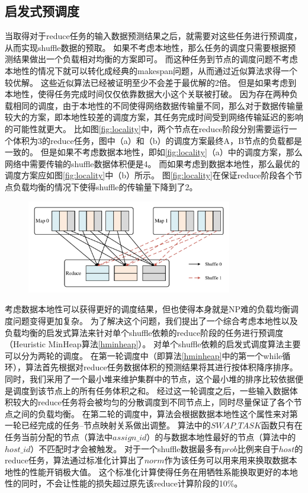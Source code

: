 \subsection{启发式预调度}
\label{subsec:schedule}

当取得对于reduce任务的输入数据预测结果之后，就需要对这些任务进行预调度，从而实现shuffle数据的预取。
如果不考虑本地性，那么任务的调度只需要根据预测结果做出一个负载相对均衡的方案即可。
而这种任务到节点的调度问题不考虑本地性的情况下就可以转化成经典的makespan问题，从而通过近似算法求得一个较优解\cite{approximation}。
这些近似算法已经被证明至少不会差于最优解的2倍。
但是如果考虑到本地性，使得任务完成时间仅仅依靠数据大小这个关联被打破。
因为存在两种负载相同的调度，由于本地性的不同使得网络数据传输量不同，那么对于数据传输量较大的方案，即本地性较差的调度方案，其任务完成时间受到网络传输延迟的影响的可能性就更大。
比如图\ref{fig:locality}中，两个节点在reduce阶段分别需要运行一个体积为3的reduce任务，图中（a）和（b）的调度方案最终A，B节点的负载都是一致的。
但是如果不考虑数据本地性，即如\ref{fig:locality}（a）中的调度方案，那么网络中需要传输的shuffle数据体积便是4。
而如果考虑到数据本地性，那么最优的调度方案应如图\ref{fig:locality}中（b）所示。
图\ref{fig:locality}在保证reduce阶段各个节点负载均衡的情况下使得shuffle的传输量下降到了2。

\begin{figure}[!htp]
    \centering
    \includegraphics[width=0.8\textwidth]{../figure/twoshuffles.pdf}
\end{figure}

考虑数据本地性可以获得更好的调度结果，但也使得本身就是NP难的负载均衡调度问题变得更加复杂。
为了解决这个问题，我们提出了一个综合考虑本地性以及负载均衡的启发式算法来针对单个shuffle依赖的reduce阶段的任务进行预调度（Heuristic MinHeap算法\ref{hminheap}）。
对单个shuffle依赖的启发式调度算法主要可以分为两轮的调度。
在第一轮调度中（即算法\ref{hminheap}中的第一个while循环），算法首先根据对reduce任务数据体积的预测结果将其进行按体积降序排序。
同时，我们采用了一个最小堆来维护集群中的节点，这个最小堆的排序比较依据便是调度到该节点上的所有任务体积之和。
经过这一轮调度之后，一些输入数据体积较大的reduce任务将会被均匀的分散调度到不同节点上，同时尽量保证了各个节点之间的负载均衡。
在第二轮的调度中，算法会根据数据本地性这个属性来对第一轮已经完成的任务--节点映射关系做出调整。
算法中的$SWAP\_TASK$函数只有在任务当前分配的节点（算法中$assign\_id$）的与数据本地性最好的节点（算法中的$host\_id$）不匹配时才会被触发。
对于一个shuffle数据最多有$prob$比例来自于$host$的reduce任务，算法通过标准化计算出了$norm$作为该任务可以用来用来换取数据本地性的性能开销极大值。
这个标准化计算使得任务在用牺牲系能换取更好的本地性的同时，不会让性能的损失超过原先该reduce计算阶段的10\%。

